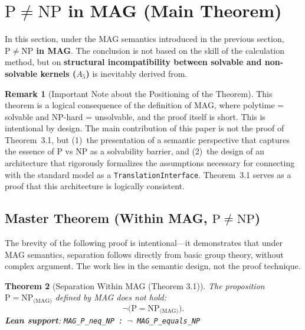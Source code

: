 \documentclass[11pt,a4paper]{article}
\theoremstyle{plain}
\newtheorem{theorem}{Theorem}[section]
\theoremstyle{definition}
\newtheorem{remark}[theorem]{Remark}
\newcommand{\Aalt}{A_5}
\newcommand{\TranslationInterface}{\texttt{TranslationInterface}}
\newcommand{\lean}[1]{\texttt{#1}}
\begin{document}
\section{$\mathrm{P} \neq \mathrm{NP}$ in MAG (Main Theorem)}

In this section, under the MAG semantics introduced in the previous section, \textbf{$\mathrm{P} \neq \mathrm{NP}$ in MAG}. The conclusion is not based on the skill of the calculation method, but on \textbf{structural incompatibility between solvable and non-solvable kernels ($\Aalt$)} is inevitably derived from.

\begin{remark}[Important Note about the Positioning of the Theorem]
This theorem is a logical consequence of the definition of MAG, where polytime = solvable and NP-hard = unsolvable, and the proof itself is short. This is intentional by design. The main contribution of this paper is not the proof of Theorem~3.1, but (1)~the presentation of a semantic perspective that captures the essence of P vs NP as a solvability barrier, and (2)~the design of an architecture that rigorously formalizes the assumptions necessary for connecting with the standard model as a \TranslationInterface{}. Theorem~3.1 serves as a proof that this architecture is logically consistent.
\end{remark}

\subsection{Master Theorem (Within MAG, $\mathrm{P} \neq \mathrm{NP}$)}

The brevity of the following proof is intentional---it demonstrates that under MAG semantics, separation follows directly from basic group theory, without complex argument. The work lies in the semantic design, not the proof technique.

\begin{theorem}[Separation Within MAG (Theorem 3.1)]\label{thm:main}
The proposition $\mathrm{P}=\mathrm{NP}_{\text{(MAG)}}$ defined by MAG does not hold:
\[
\neg\bigl(\mathrm{P}=\mathrm{NP}_{\text{(MAG)}}\bigr).
\]
\textbf{Lean support}: \lean{MAG\_P\_neq\_NP : $\neg$ MAG\_P\_equals\_NP}
\end{theorem}
\end{document}
